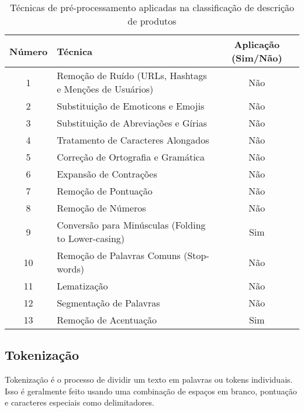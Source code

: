 \begin{table}[h]
\centering
\begin{tabular}{c|p{5cm}|c}
\hline
Número & Técnica & Aplicação (Sim/Não) \\
\hline
1 & Remoção de Ruído (URLs, Hashtags e Menções de Usuários) & Não \\
\hline
2 & Substituição de Emoticons e Emojis & Não \\
\hline
3 & Substituição de Abreviações e Gírias & Não \\
\hline
4 & Tratamento de Caracteres Alongados & Não \\
\hline
5 & Correção de Ortografia e Gramática & Não \\
\hline
6 & Expansão de Contrações & Não \\
\hline
7 & Remoção de Pontuação & Não \\
\hline
8 & Remoção de Números & Não \\
\hline
9 & Conversão para Minúsculas (Folding to Lower-casing) & Sim \\
\hline
10 & Remoção de Palavras Comuns (Stop-words) & Não \\
\hline
11 & Lematização & Não \\
\hline
12 & Segmentação de Palavras & Não \\
\hline
13 & Remoção de Acentuação & Sim \\
\hline
\end{tabular}
\caption{Técnicas de pré-processamento aplicadas na classificação de descrição de produtos}
\label{table:preprocessamento}
\end{table}

\subsection{Tokenização}\label{subsec:tokenizacao}
  Tokenização é o processo de dividir um texto em palavras ou tokens individuais. Isso é geralmente feito usando uma combinação de espaços em branco, pontuação e caracteres especiais como delimitadores.
  
